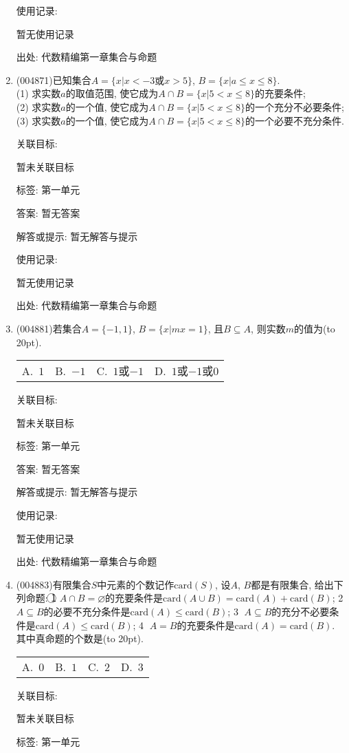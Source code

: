 \documentclass[10pt,a4paper]{article}
\newcommand{\bracket}[1]{(\hbox to #1pt{})}
\newcommand{\fourch}[4]{\par\begin{tabular}{p{.23\textwidth}p{.23\textwidth}p{.23\textwidth}p{.23\textwidth}}
A.~#1 &B.~#2& C.~#3& D.~#4
\end{tabular}}
\begin{document}
\begin{enumerate}[1.]
使用记录:

暂无使用记录


出处: 代数精编第一章集合与命题
\item { (004871)}已知集合$A=\{x|x<-3\text{或}x>5\}$, $B=\{x|a\le x\le 8\}$.\\
(1) 求实数$a$的取值范围, 使它成为$A\cap B=\{x|5<x\le 8\}$的充要条件;\\
(2) 求实数$a$的一个值, 使它成为$A\cap B=\{x|5<x\le 8\}$的一个充分不必要条件;\\
(3) 求实数$a$的一个值, 使它成为$A\cap B=\{x|5<x\le 8\}$的一个必要不充分条件.


关联目标:

暂未关联目标



标签: 第一单元

答案: 暂无答案

解答或提示: 暂无解答与提示

使用记录:

暂无使用记录


出处: 代数精编第一章集合与命题
\item { (004881)}若集合$A=\{-1,1\}$, $B=\{x|mx=1\}$, 且$B\subseteq A$, 则实数$m$的值为\bracket{20}.
\fourch{$1$}{$-1$}{$1$或$-1$}{$1$或$-1$或$0$}


关联目标:

暂未关联目标



标签: 第一单元

答案: 暂无答案

解答或提示: 暂无解答与提示

使用记录:

暂无使用记录


出处: 代数精编第一章集合与命题
\item { (004883)}有限集合$S$中元素的个数记作$\mathrm{card}(S)$, 设$A$, $B$都是有限集合, 给出下列命题:
\textcircled{1} $A\cap B=\varnothing$的充要条件是$\mathrm{card}(A\cup B)=\mathrm{card}(A)+\mathrm{card}(B)$; \textcircled{2} $A\subseteq B$的必要不充分条件是$\mathrm{card}(A)\le \mathrm{card}(B)$; \textcircled{3} $A\subseteq B$的充分不必要条件是$\mathrm{card}(A)\le \mathrm{card}(B)$; \textcircled{4} $A=B$的充要条件是$\mathrm{card}(A)=\mathrm{card}(B)$. 
其中真命题的个数是\bracket{20}.
\fourch{$0$}{$1$}{$2$}{$3$}


关联目标:

暂未关联目标



标签: 第一单元


\end{enumerate}
\end{document}

